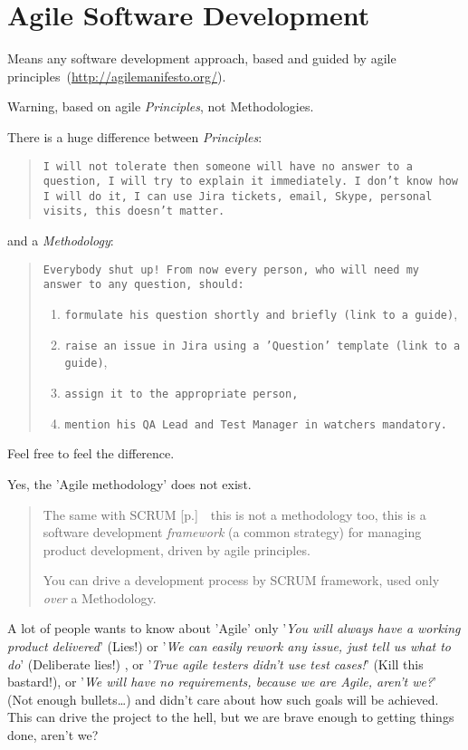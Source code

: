 \section{Agile Software Development}
\label{sec:Agile Software Development}

Means any software development approach, based and guided by agile principles~(\url{http://agilemanifesto.org/}).

Warning, based on agile \emph{Principles}, not Methodologies. 

There is a huge difference between \emph{Principles}:
\begin{quote}
\texttt{I will not tolerate then someone will have no answer to a question, I will try to explain it immediately. I don't know how I will do it, I can use Jira tickets, email, Skype, personal visits, this doesn't matter.}
\end{quote} 
and a \emph{Methodology}:
\begin{quote}
\texttt{Everybody shut up! From now every person, who will need my answer to any question, should:}
\begin{enumerate}
\item 
\texttt{formulate his question shortly and briefly (link to a guide)},

\item
\texttt{raise an issue in Jira using a 'Question' template (link to a guide)},

\item
\texttt{assign it to the appropriate person,}

\item 
\texttt{mention his QA Lead and Test Manager in watchers mandatory.}
\end{enumerate}
\end{quote} 

Feel free to feel the difference.

Yes, the 'Agile methodology' does not exist.

\begin{quote}
The same with SCRUM [p.\pageref{sec:SCRUM}]~\textemdash~this is not a methodology too, this is a software development \emph{framework} (a common strategy) for managing product development, driven by agile principles. 

You can drive a development process by SCRUM framework, used only \emph{over} a Methodology.
\end{quote} 

A lot of people wants to know about 'Agile' only '\textit{You will always have a working product delivered}' (Lies!) or '\textit{We can easily rework any issue, just tell us what to do}' (Deliberate lies!) , or '\textit{True agile testers didn't use test cases!}' (Kill this bastard!), or '\textit{We will have no requirements, because we are Agile, aren't we?}' (Not enough bullets\ldots) and didn't care about how such goals will be achieved. This can drive the project to the hell, but we are brave enough to getting things done, aren't we?
